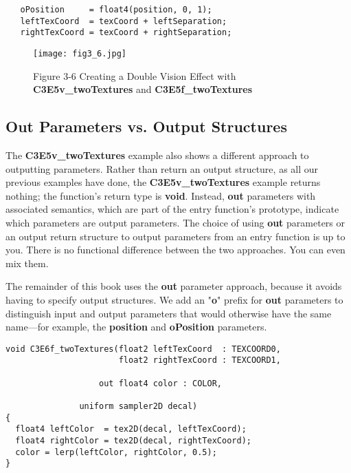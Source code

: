 \documentclass[../main.tex]{subfiles}
\begin{document}
\FloatBarrier
\begin{lstlisting}
   oPosition     = float4(position, 0, 1);
   leftTexCoord  = texCoord + leftSeparation;
   rightTexCoord = texCoord + rightSeparation;
\end{lstlisting}
\FloatBarrier

\begin{figure}
    \centering
    \texttt{[image: fig3\_6.jpg]}
    \caption{Figure 3-6 Creating a Double Vision Effect with \textbf{C3E5v_twoTextures} and \textbf{C3E5f_twoTextures}}
    \label{fig:3-6}
\end{figure}

\subsection*{Out Parameters vs. Output Structures}

The \textbf{C3E5v_twoTextures} example also shows a different approach to outputting parameters. Rather than return an output structure, as all our previous examples have done, the \textbf{C3E5v_twoTextures} example returns nothing; the function's return type is \textbf{void}. Instead, \textbf{out} parameters with associated semantics, which are part of the entry function's prototype, indicate which parameters are output parameters. The choice of using \textbf{out} parameters or an output return structure to output parameters from an entry function is up to you. There is no functional difference between the two approaches. You can even mix them.

The remainder of this book uses the \textbf{out} parameter approach, because it avoids having to specify output structures. We add an "\textbf{o}" prefix for \textbf{out} parameters to distinguish input and output parameters that would otherwise have the same name—for example, the \textbf{position} and \textbf{oPosition} parameters.

\FloatBarrier
\begin{lstlisting}[caption=Example 3-6. The \textbf{C3E6f_twoTextures} Fragment Program]
void C3E6f_twoTextures(float2 leftTexCoord  : TEXCOORD0,
                       float2 rightTexCoord : TEXCOORD1,

                   out float4 color : COLOR,

               uniform sampler2D decal)
{
  float4 leftColor  = tex2D(decal, leftTexCoord);
  float4 rightColor = tex2D(decal, rightTexCoord);
  color = lerp(leftColor, rightColor, 0.5);
}
\end{lstlisting}
\FloatBarrier
\end{document}
